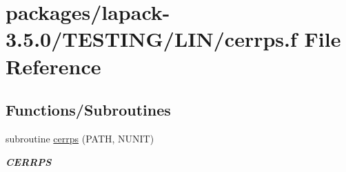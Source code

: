 \hypertarget{cerrps_8f}{}\section{packages/lapack-\/3.5.0/\+T\+E\+S\+T\+I\+N\+G/\+L\+I\+N/cerrps.f File Reference}
\label{cerrps_8f}
\subsection*{Functions/\+Subroutines}
\begin{DoxyCompactItemize}
\item 
subroutine \hyperlink{group__complex__lin_ga8e378f7a528a248e3bc98ee6f9ae4899}{cerrps} (P\+A\+T\+H, N\+U\+N\+I\+T)
\begin{DoxyCompactList}\small\item\em {\bfseries C\+E\+R\+R\+P\+S} \end{DoxyCompactList}\end{DoxyCompactItemize}
